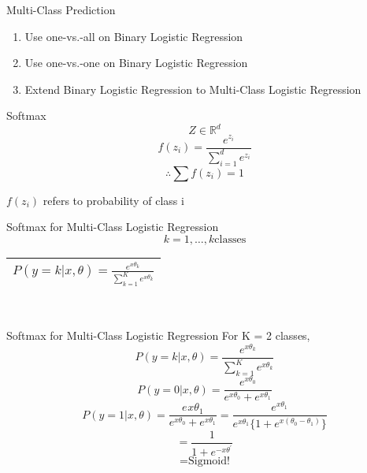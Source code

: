 \documentclass{beamer}
\begin{document}
	\begin{frame}{Multi-Class Prediction}
	    \begin{enumerate}
	        \item Use one-vs.-all on Binary Logistic Regression
	        \item Use one-vs.-one on Binary Logistic Regression
	        \item Extend Binary Logistic Regression to Multi-Class Logistic Regression
	    \end{enumerate}
	\end{frame}
	\begin{frame}{Softmax}
	    \begin{equation*}
	        Z \in \mathbb{R}^{d}
	    \end{equation*}
	    \begin{equation*}
	        f(z_{i}) = \frac{e^{z_{i}}}{\sum_{i=1}^{d}e^{z_{i}}}
	    \end{equation*}
	    \begin{equation*}
	        \therefore \sum f(z_{i}) = 1
	    \end{equation*}
	    
	    $f(z_{i})$ refers to probability of class i
	\end{frame}
	\begin{frame}{Softmax for Multi-Class Logistic Regression}
	    \begin{equation*}
	       k = 1, \ldots, k \text{classes}
	    \end{equation*}
	    \centering
	  \begin{tabular}{|c|} \hline
        $P(y = k|x, \theta) = \frac{e^{x\theta_{k}}}{\sum_{k=1}^{K}e^{x\theta_{k}}}$\\ \hline
      \end{tabular}\\
	\end{frame}
	\begin{frame}{Softmax for Multi-Class Logistic Regression}
	    For K = 2 classes,
	    \begin{equation*}
	        P(y = k|x, \theta) = \frac{e^{x\theta_{k}}}{\sum_{k=1}^{K}e^{x\theta_{k}}}
	    \end{equation*}
	    \begin{equation*}
	        P(y = 0|x, \theta) = \frac{e^{x\theta_{0}}}{e^{x\theta_{0}} + e^{x\theta_{1}}}
	    \end{equation*}
	    \begin{equation*}
	        P(y = 1|x, \theta) = \frac{e^{}x\theta_{1}}{e^{x\theta_{0}} + e^{x\theta_{1}}} = \frac{e^{x\theta_{1}}}{e^{x\theta_{1}}\{1 + e^{x(\theta_{0} - \theta_{1})}\}}
	    \end{equation*}
	    \begin{equation*}
	       = \frac{1}{1 + e^{-x\theta^{'}}}
	    \end{equation*}
	    \begin{equation*}
	        = \text{Sigmoid!}
	    \end{equation*}
	\end{frame}
\end{document}
